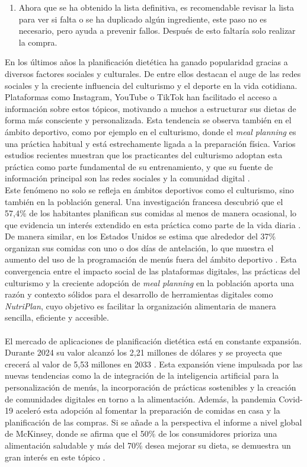 \documentclass[twoside, openright, 11pt]{report}
\begin{document}
\begin{enumerate}
			
			\item Ahora que se ha obtenido la lista definitiva, es recomendable revisar la lista para ver si falta o se ha duplicado algún ingrediente, este paso no es necesario, pero ayuda a prevenir fallos. Después de esto faltaría solo realizar la compra.
		\end{enumerate}
		En los últimos años la planificación dietética ha ganado popularidad gracias a diversos factores sociales y culturales. De entre ellos destacan el auge de las redes sociales y la creciente influencia del culturismo y el deporte en la vida cotidiana. Plataformas como Instagram, YouTube o TikTok han facilitado el acceso a información sobre estos tópicos, motivando a muchos a estructurar sus dietas de forma más consciente y personalizada. Esta tendencia se observa también en el ámbito deportivo, como por ejemplo en el culturismo, donde el \textit{meal planning} es una práctica habitual y está estrechamente ligada a la preparación física. Varios estudios recientes muestran que los practicantes del culturismo adoptan esta práctica como parte fundamental de su entrenamiento, y que su fuente de información principal son las redes sociales y la comunidad digital \cite{helms2019,masoga2021,benjamins2021}.
		\\
		Este fenómeno no solo se refleja en ámbitos deportivos como el culturismo, sino también en la población general. Una investigación francesa descubrió que el 57,4\% de los habitantes planifican sus comidas al menos de manera ocasional, lo que evidencia un interés extendido en esta práctica como parte de la vida diaria \cite{ducrot2017}. De manera similar, en los Estados Unidos se estima que alrededor del 37\% organizan sus comidas con uno o dos días de antelación, lo que muestra el aumento del uso de la programación de menús fuera del ámbito deportivo \cite{fmi2015}. Esta convergencia entre el impacto social de las plataformas digitales, las prácticas del culturismo y la creciente adopción de \textit{meal planning} en la población aporta una razón y contexto sólidos para el desarrollo de herramientas digitales como \textit{NutriPlan}, cuyo objetivo es facilitar la organización alimentaria de manera sencilla, eficiente y accesible.
		\\\\
		El mercado de aplicaciones de planificación dietética está en constante expansión. Durante 2024 su valor alcanzó los 2,21 millones de dólares y se proyecta que crecerá al valor de 5,53 millones en 2033 \cite{businessresearchinsights2024}. Esta expansión viene impulsada por las nuevas tendencias como la de integración de la inteligencia artificial para la personalización de menús, la incorporación de prácticas sostenibles y la creación de comunidades digitales en torno a la alimentación. Además, la pandemia Covid-19 aceleró esta adopción al fomentar la preparación de comidas en casa y la planificación de las compras. Si se añade a la perspectiva el informe a nivel global de McKinsey, donde se afirma que el 50\% de los consumidores prioriza una alimentación saludable y más del 70\% desea mejorar su dieta, se demuestra un gran interés en este tópico \cite{mckinsey2023}.
\end{document}
